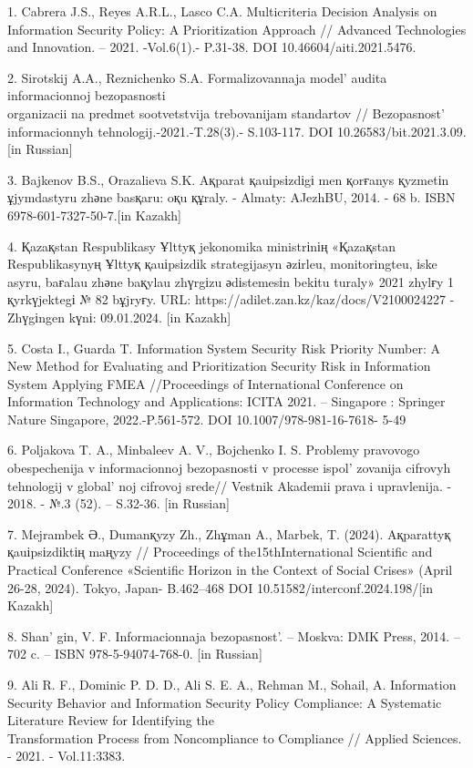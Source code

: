 \begin{references}
1. Cabrera J.S., Reyes A.R.L., Lasco C.A. Multicriteria Decision Analysis
on Information Security Policy: A Prioritization Approach // Advanced
Technologies and Innovation. -- 2021. -Vol.6(1).- P.31-38. DOI
10.46604/aiti.2021.5476.

2. Sirotskij A.A., Reznichenko S.A. Formalizovannaja
model'{} audita informacionnoj bezopasnosti \\organizacii
na predmet sootvetstvija trebovanijam standartov //
Bezopasnost'{} informacionnyh tehnologij.-2021.-T.28(3).-
S.103-117. DOI 10.26583/bit.2021.3.09.{[}in Russian{]}

3. Bajkenov B.S., Orazalieva S.K. Aқparat қauіpsіzdіgі men қorғanys
қyzmetіn ұjymdastyru zhәne basқaru: oқu құraly. - Almaty: AJezhBU, 2014.
- 68 b. ISBN 6978-601-7327-50-7.{[}in Kazakh{]}

4. Қazaқstan Respublikasy Ұlttyқ jekonomika ministrіnің «Қazaқstan
Respublikasynyң Ұlttyқ қauіpsіzdіk strategijasyn әzіrleu, monitoringteu,
іske asyru, baғalau zhәne baқylau zhүrgіzu әdіstemesіn bekіtu turaly»
2021 zhylғy 1 қyrkүjektegі № 82 bұjryғy. URL:
https://adilet.zan.kz/kaz/docs/V2100024227 - Zhүgіngen kүnі: 09.01.2024.
{[}in Kazakh{]}

5. Costa I., Guarda T. Information System Security Risk Priority Number:
A New Method for Evaluating and Prioritization Security Risk in
Information System Applying FMEA //Proceedings of International
Conference on Information Technology and Applications: ICITA 2021. --
Singapore : Springer Nature Singapore, 2022.-P.561-572. DOI
10.1007/978-981-16-7618- 5-49

6. Poljakova T. A., Minbaleev A. V., Bojchenko I. S. Problemy pravovogo
obespechenija v informacionnoj bezopasnosti v processe
ispol' zovanija cifrovyh tehnologij v
global' noj cifrovoj srede// Vestnik Akademii prava i
upravlenija. - 2018. - №.3 (52). -- S.32-36. {[}in Russian{]}

7. Mejrambek Ә., Dumanқyzy Zh., Zhұman A., Marbek, T. (2024). Aқparattyқ
қauіpsіzdіktің maңyzy // Proceedings of the15thInternational Scientific
and Practical Conference «Scientific Horizon in the Context of Social
Crises» (April 26-28, 2024). Tokyo, Japan- B.462--468
DOI 10.51582/interconf.2024.198/{[}in Kazakh{]}

8. Shan' gin, V. F. Informacionnaja
bezopasnost'. -- Moskva: DMK Press, 2014. -- 702 c. --
ISBN 978-5-94074-768-0. {[}in Russian{]}

9. Ali R. F., Dominic P. D. D., Ali S. E. A., Rehman M., Sohail, A.
Information Security Behavior and Information Security Policy
Compliance: A Systematic Literature Review for Identifying the\\
Transformation Process from Noncompliance to Compliance // Applied
Sciences. - 2021. - Vol.11:3383.
\href{https://doi.org/10.3390/app11083383}{}


\end{references}
